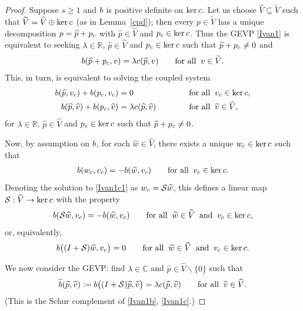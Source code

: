 \documentclass[10pt,a4paper]{amsart}
\newcommand{\assign}{\mathrel{\mathop:}=}
\newcommand{\scS}{\mathcal{S}}
\newcommand{\txtb}{\textup{\texttt{b}}}
\newcommand{\txtc}{\textup{\texttt{c}}}
\newcommand{\wV}{\widetilde{V}}
\newcommand{\whV}{\widehat{V}}
\newcommand{\whp}{\widehat{p}}
\newcommand{\whv}{\widehat{v}}
\newcommand{\whw}{\widehat{w}}
\begin{document}
\begin{proof}
Suppose $s \ge 1$ and $\txtb$ is positive definite on $\ker \txtc$. 
Let us choose $\whV\subseteq\wV$ such that $\wV = \whV\oplus \ker \txtc$ (as in Lemma~\ref{cpd});
then every $p \in \wV$ has a unique decomposition $p = \whp + p_{\txtc} $ with $\whp\in \whV$ and  $p_{\txtc}\in \ker \txtc$. 
Thus the GEVP \eqref{Ivan1} is equivalent to seeking $\lambda \in \mathbb{R}$, $\whp \in \whV$ and  $p_{\txtc} \in \ker \txtc$ such
that $\whp + p_{\txtc} \ne 0$ and  
\begin{align} \label{Ivan1a} 
	\txtb(\whp + p_{\txtc}, v ) = \lambda \txtc (\whp, v) \qquad \text{for all} \;\; v \in \wV.
\end{align}
This, in turn, is equivalent to solving  the coupled system
\begin{alignat}{2}
	\txtb(\whp, v_\txtc) + \txtb(p_{\txtc}, v_{\txtc})    &= 0 \qquad 
	&& \text{for all} \;\; v_{\txtc} \in \ker \txtc, 
	\label{Ivan1b}\\
	\txtb(\whp,\whv) + \txtb(p_{\txtc},\whv) &= \lambda \txtc (\whp,\whv) \qquad\quad 
	&& \text{for all} \;\; \whv \in \whV,
	\label{Ivan1c}
\end{alignat}
for $\lambda \in \mathbb{R}$,   $\whp\in \whV$ and $p_{\txtc} \in \ker \txtc$ such
that $ \whp + p_{\txtc} \ne 0$. 
    
Now, by assumption on  $\txtb$, for each $\whw \in \whV$, there exists a unique $w_\txtc \in \ker \txtc$ such that
\begin{align}\label{Ivan1c1} 
	\txtb(w_\txtc, v_\txtc) = - \txtb(\whw , v_\txtc) \qquad \text{for all} \;\; v_\txtc \in \ker \txtc. 
\end{align} 
Denoting the solution to \eqref{Ivan1c1} as $w_\txtc = \scS \whw$, this defines a  linear map
$\scS: \whV\rightarrow \ker \txtc$ with the property
\begin{align}\label{Ivan1b1}
	\txtb(\scS \whw, v_\txtc) = - \txtb(\whw, v_\txtc) \qquad \text{for all} \;\;
	\whw \in \whV \;\; \text{and} \;\; v_\txtc \in \ker \txtc,
\end{align}
or, equivalently,  
\begin{align} \label{Ivan1d} 
	\txtb\bigl((I + \scS) \whw, v_\txtc\bigr) = 0 \qquad \text{for all} \;\; \whw \in \whV \;\; \text{and} \;\; v_\txtc \in \ker \txtc.
\end{align} 

We now  consider the GEVP: find $\lambda \in \mathbb{C}$ and   $\whp \in \whV\backslash \{0\}$ such that
\begin{align} \label{Ivan1e} 
	\widetilde{\txtb} (\whp, \whv) \assign \txtb\bigl((I + \scS) \whp, \whv\bigr) = \lambda \txtc(\whp, \whv) \qquad 
	\text{for all} \;\; \whv \in \whV.  
\end{align}
(This is the Schur complement of \eqref{Ivan1b}, \eqref{Ivan1c}.)
    

\end{proof}
\end{document}
